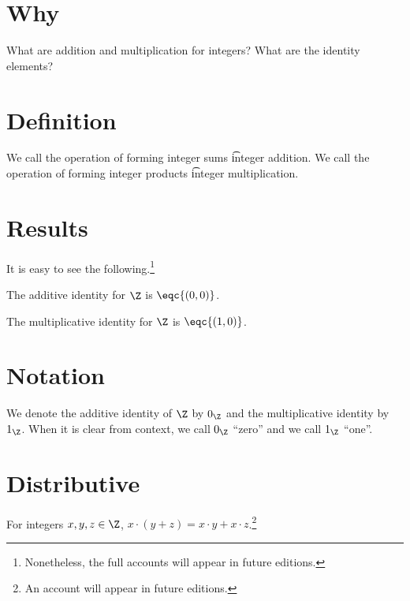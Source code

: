
\section*{Why}

What are addition and multiplication for integers?
What are the identity elements?

\section*{Definition}

We call the operation of forming integer sums \t{integer addition}.
We call the operation of forming integer products \t{integer multiplication}.

\section*{Results}

It is easy to see the following.\footnote{Nonetheless, the full accounts will appear in future editions.}

\begin{proposition}
The additive identity for $\Z $ is $\eqc{(0, 0)}$.
\end{proposition}

\begin{proposition}
The multiplicative identity for $\Z $ is $\eqc{(1, 0)}$.
\end{proposition}

\section*{Notation}

We denote the additive identity of $\Z $ by $0_{\Z }$ and the multiplicative identity by $1_{\Z }$.
When it is clear from context, we call $0_{\Z }$ ``zero'' and we call $1_{\Z }$ ``one''.

\section*{Distributive}

\begin{proposition}
For integers $x, y, z \in \Z $, $x \cdot  (y + z) = x \cdot  y + x \cdot  z$.\footnote{An account will appear in future editions.}
\end{proposition}

\blankpage